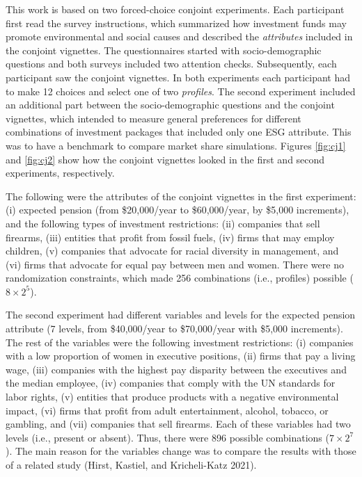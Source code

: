 \documentclass[
  12pt,
]{article}
\begin{document}
This work is based on two forced-choice conjoint experiments. Each participant first read the survey instructions, which summarized how investment funds may promote environmental and social causes and described the \emph{attributes} included in the conjoint vignettes. The questionnaires started with socio-demographic questions and both surveys included two attention checks. Subsequently, each participant saw the conjoint vignettes. In both experiments each participant had to make 12 choices and select one of two \emph{profiles}. The second experiment included an additional part between the socio-demographic questions and the conjoint vignettes, which intended to measure general preferences for different combinations of investment packages that included only one ESG attribute. This was to have a benchmark to compare market share simulations. Figures \ref{fig:cj1} and \ref{fig:cj2} show how the conjoint vignettes looked in the first and second experiments, respectively.

The following were the attributes of the conjoint vignettes in the first experiment: (i) expected pension (from \$20,000/year to \$60,000/year, by \$5,000 increments), and the following types of investment restrictions: (ii) companies that sell firearms, (iii) entities that profit from fossil fuels, (iv) firms that may employ children, (v) companies that advocate for racial diversity in management, and (vi) firms that advocate for equal pay between men and women. There were no randomization constraints, which made 256 combinations (i.e., profiles) possible (\(8 \times 2^5\)).

The second experiment had different variables and levels for the expected pension attribute (7 levels, from \$40,000/year to \$70,000/year with \$5,000 increments). The rest of the variables were the following investment restrictions: (i) companies with a low proportion of women in executive positions, (ii) firms that pay a living wage, (iii) companies with the highest pay disparity between the executives and the median employee, (iv) companies that comply with the UN standards for labor rights, (v) entities that produce products with a negative environmental impact, (vi) firms that profit from adult entertainment, alcohol, tobacco, or gambling, and (vii) companies that sell firearms. Each of these variables had two levels (i.e., present or absent). Thus, there were 896 possible combinations (\(7 \times 2^7\)). The main reason for the variables change was to compare the results with those of a related study (Hirst, Kastiel, and Kricheli-Katz 2021).
\end{document}
